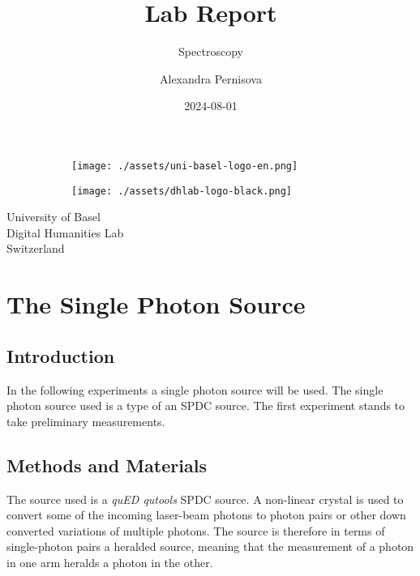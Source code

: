 \documentclass[12pt,a4paper]{article} %
\title{Lab Report}        %
\subtitle{Spectroscopy}  %
\author{Alexandra Pernisova}         %
\date{2024-08-01}                   %
\begin{document}
\renewcommand{\arraystretch}{1.3}
\maketitle

\begin{center}
    \vfill
    \begin{figure}
        \centering
        \begin{subfigure}{.3\textwidth}
          \centering
          \texttt{[image: ./assets/uni-basel-logo-en.png]}
        \end{subfigure}%
        \begin{subfigure}{.3\textwidth}
          \centering
          \texttt{[image: ./assets/dhlab-logo-black.png]}
        \end{subfigure}
        \end{figure}
        \setcounter{figure}{0}
        
    University of Basel\\
    Digital Humanities Lab\\
    Switzerland
\end{center}
\newpage
\renewcommand*\contentsname{Table of Contents} %
{
\hypersetup{linkcolor=}
\setcounter{tocdepth}{5} %
\tableofcontents
}
\newpage
{} %

\section{The Single Photon Source}
\subsection{Introduction}
    In the following experiments a single photon source will be used. The single photon source used is a type of an SPDC source. The first experiment stands to take preliminary measurements.
\subsection{Methods and Materials}
    The source used is a \textit{quED qutools} SPDC source. A non-linear crystal is used to convert some of the incoming laser-beam photons to photon pairs or other down converted variations of multiple photons. The source is therefore in terms of single-photon pairs a heralded source, meaning that the measurement of a photon in one arm heralds a photon in the other. 
\end{document}
